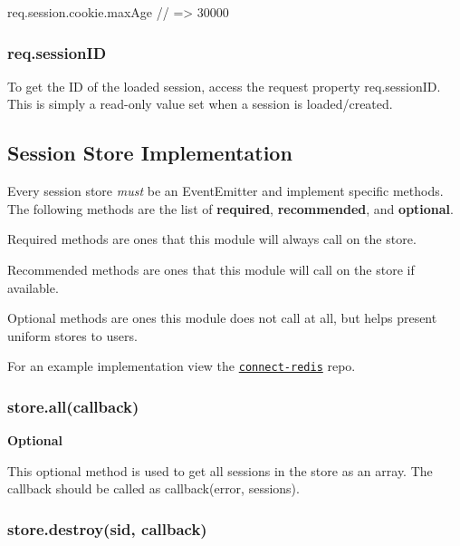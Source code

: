 \begin{DoxyCode}
req.session.cookie.maxAge // => 30000
\end{DoxyCode}


\subsubsection*{req.\+session\+ID}

To get the ID of the loaded session, access the request property {\ttfamily req.\+session\+ID}. This is simply a read-\/only value set when a session is loaded/created.

\subsection*{Session Store Implementation}

Every session store {\itshape must} be an {\ttfamily Event\+Emitter} and implement specific methods. The following methods are the list of {\bfseries required}, {\bfseries recommended}, and {\bfseries optional}.


\begin{DoxyItemize}
\item Required methods are ones that this module will always call on the store.
\item Recommended methods are ones that this module will call on the store if available.
\item Optional methods are ones this module does not call at all, but helps present uniform stores to users.
\end{DoxyItemize}

For an example implementation view the \href{http://github.com/visionmedia/connect-redis}{\tt connect-\/redis} repo.

\subsubsection*{store.\+all(callback)}

{\bfseries Optional}

This optional method is used to get all sessions in the store as an array. The {\ttfamily callback} should be called as {\ttfamily callback(error, sessions)}.

\subsubsection*{store.\+destroy(sid, callback)}

